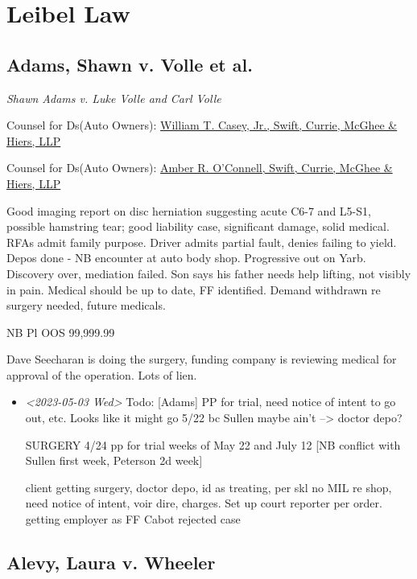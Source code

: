 \documentclass[11pt]{article}
\author{Paul Menair}
\date{\today}
\title{}
\begin{document}
\section*{Leibel Law}
\label{sec:orgfbf6d77}

\subsection*{Adams, Shawn v. Volle et al.}
\label{sec:orga5eeffe}

\emph{Shawn Adams v. Luke Volle and Carl Volle}

Counsel for Ds(Auto Owners): \href{https://gabar.reliaguide.com/lawyer/30309-GA-William-Casey-272796}{William T. Casey, Jr., Swift, Currie, McGhee \& Hiers, LLP}

Counsel for Ds(Auto Owners): \href{https://gabar.reliaguide.com/lawyer/30533-GA-Amber-OConnell-282120}{Amber R. O’Connell, Swift, Currie, McGhee \& Hiers, LLP}

Good imaging report on disc herniation suggesting acute C6-7 and L5-S1, possible hamstring tear; good liability case, significant damage, solid medical. RFAs admit family purpose. Driver admits partial fault, denies failing to yield. Depos done - NB encounter at auto body shop. Progressive out on Yarb. Discovery over, mediation failed. Son says his father needs help lifting, not visibly in pain. Medical should be up to date, FF identified. Demand withdrawn re surgery needed, future medicals.

NB Pl OOS 99,999.99

Dave Seecharan is doing the surgery, funding company is reviewing medical for approval of the operation. Lots of lien.

\begin{itemize}
\item \textit{<2023-05-03 Wed> } Todo: [Adams] PP for trial, need notice of intent to go out, etc. Looks like it might go 5/22 bc Sullen maybe ain't --> doctor depo?

SURGERY 4/24 pp for trial weeks of May 22 and July 12 [NB conflict with Sullen first week, Peterson 2d week]

client getting surgery, doctor depo, id as treating, per skl no MIL re shop, need notice of intent, voir dire, charges. Set up court reporter per order. getting employer as FF Cabot rejected case
\end{itemize}

\subsection*{Alevy, Laura v. Wheeler}
\label{sec:orgf31405d}
\end{document}

